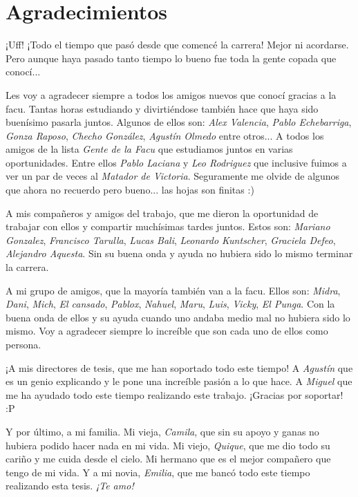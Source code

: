 \chapter*{Agradecimientos}

\noindent ¡Uff! ¡Todo el tiempo que pasó desde que comencé la carrera! Mejor ni acordarse. Pero aunque haya pasado tanto tiempo lo bueno fue toda la gente copada que conocí...

\noindent Les voy a agradecer siempre a todos los amigos nuevos que conocí gracias a la facu. Tantas horas estudiando y divirtiéndose también hace que haya sido buenísimo pasarla juntos. Algunos de ellos son: \textit{Alex Valencia}, \textit{Pablo Echebarriga}, \textit{Gonza Raposo}, \textit{Checho González}, \textit{Agustín Olmedo} entre otros... A todos los amigos de la lista \textit{Gente de la Facu} que estudiamos juntos en varias oportunidades. Entre ellos \textit{Pablo Laciana} y \textit{Leo Rodriguez} que inclusive fuimos a ver un par de veces al \textit{Matador de Victoria}. Seguramente me olvide de algunos que ahora no recuerdo pero bueno... las hojas son finitas :) 

\noindent A mis compañeros y amigos del trabajo, que me dieron la oportunidad de trabajar con ellos y compartir muchísimas tardes juntos. Estos son: \textit{Mariano Gonzalez}, \textit{Francisco Tarulla}, \textit{Lucas Bali}, \textit{Leonardo Kuntscher}, \textit{Graciela Defeo}, \textit{Alejandro Aquesta}. Sin su buena onda y ayuda no hubiera sido lo mismo terminar la carrera.

\noindent A mi grupo de amigos, que la mayoría también van a la facu. Ellos son: \textit{Midra}, \textit{Dani}, \textit{Mich}, \textit{El cansado}, \textit{Pablox}, \textit{Nahuel}, \textit{Maru}, \textit{Luis}, \textit{Vicky}, \textit{El Punga}. Con la buena onda de ellos y su ayuda cuando uno andaba medio mal no hubiera sido lo mismo. Voy a agradecer siempre lo increíble que son cada uno de ellos como persona.

\noindent ¡A mis directores de tesis, que me han soportado todo este tiempo! A \textit{Agustín} que es un genio explicando y le pone una increíble pasión a lo que hace. A \textit{Miguel} que me ha ayudado todo este tiempo realizando este trabajo. ¡Gracias por soportar! :P

\noindent Y por último, a mi familia. Mi vieja, \textit{Camila}, que sin su apoyo y ganas no hubiera podido hacer nada en mi vida. Mi viejo, \textit{Quique}, que me dio todo su cariño y me cuida desde el cielo. Mi hermano que es el mejor compañero que tengo de mi vida. Y a mi novia, \textit{Emilia}, que me bancó todo este tiempo realizando esta tesis. \textit{¡Te amo!}   

   

